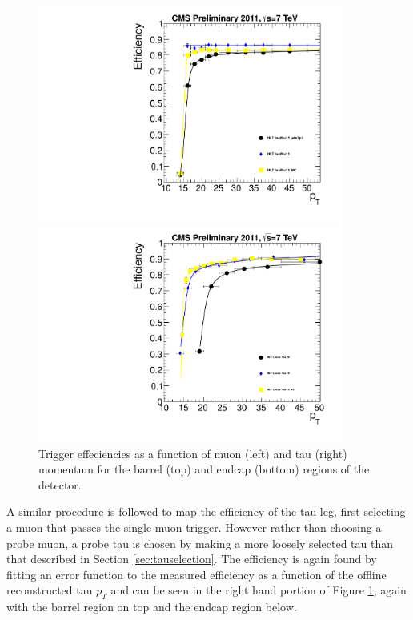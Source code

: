 \begin{figure}[ht]
\begin{minipage}[b]{0.45\linewidth}
\centering
\includegraphics[width=0.9\textwidth]{plots/MuonLegEffE.pdf}
\end{minipage}
\begin{minipage}[b]{0.45\linewidth}
\centering
\includegraphics[width=0.9\textwidth]{plots/TauLegEffMuTauE.pdf}
\end{minipage}
\caption{Trigger effeciencies as a function of muon (left) and tau (right) momentum for the barrel (top) and endcap (bottom) regions of the detector.}
\label{fig:turnoncurve}
\end{figure}

A similar procedure is followed to map the efficiency of the tau leg, first selecting a muon that passes the single muon trigger. 
However rather than choosing a probe muon, a probe tau is chosen by making a more loosely selected tau than that described in Section \ref{sec:tauselection}.
The efficiency is again found by fitting an error function to the measured efficiency as a function of the offline reconstructed tau $p_{T}$ and can be seen in the right hand portion of Figure \ref{fig:turnoncurve}, again with the barrel region on top and the endcap region below.

